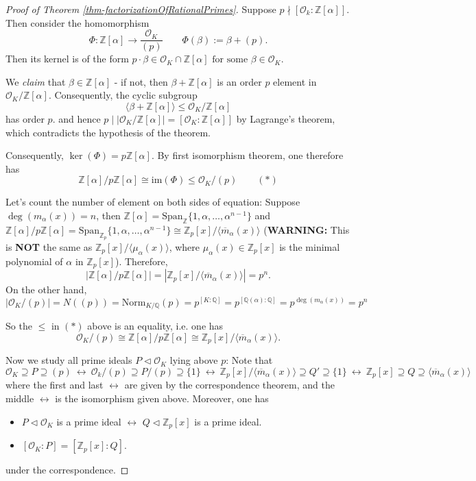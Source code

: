 \documentclass[11pt]{book}
\begin{document}
\begin{proof}[Proof of Theorem \ref{thm-factorizationOfRationalPrimes}]
Suppose $ p \nmid [\mathcal{O}_k : \mathbb{Z}[\alpha]]$. Then consider the homomorphism
$$
\Phi: \mathbb{Z}[\alpha] \longrightarrow \frac{\mathcal{O}_K}{(p)} \quad \quad \Phi(\beta):= \beta + (p).
$$
Then its kernel is of the form
$
p \cdot \beta \in \mathcal{O}_K \cap \mathbb{Z}[\alpha] \text{ for some } \beta \in \mathcal{O}_K.
$

We \textit{claim} that $\beta \in \mathbb{Z}[\alpha]$ - if not, then
$\beta + \mathbb{Z}[\alpha]$ is an order $p$ element in $\mathcal{O}_K/\mathbb{Z}[\alpha]$. Consequently, the cyclic subgroup
$$\langle \beta + \mathbb{Z}[\alpha] \rangle \leq \mathcal{O}_K/\mathbb{Z}[\alpha]$$ 
has order $p$. and hence $ p \mid \left|\mathcal{O}_K/\mathbb{Z}[\alpha]\right| = [\mathcal{O}_K : \mathbb{Z}[\alpha]]$ by Lagrange's theorem, which contradicts the hypothesis of the theorem.

\medskip
Consequently, $\ker(\Phi) = p\mathbb{Z}[\alpha]$. By first isomorphism theorem, one therefore has
$$\mathbb{Z}[\alpha]/ p \mathbb{Z}[\alpha] \cong \mathrm{im}(\Phi) \leq \mathcal{O}_K/(p)  \quad \quad   (*)$$

Let's count the number of element on both sides of equation: Suppose $\deg(m_{\alpha}(x)) = n$, then $\mathbb{Z}[\alpha] = \text{Span}_{\mathbb{Z}} \{1, \alpha, \ldots, \alpha^{n-1}\}$
and $\mathbb{Z}[\alpha]/p\mathbb{Z}[\alpha] = \text{Span}_{\mathbb{Z}_p} \{1, \alpha, \ldots, \alpha^{n-1}\} \cong  \mathbb{Z}_p[x]/\langle \overline{m}_{\alpha}(x)\rangle$ ({\bf WARNING:} This is {\bf NOT} the same as $\mathbb{Z}_p[x]/\langle\mu_{\alpha}(x)\rangle$, where $\mu_{\alpha}(x) \in \mathbb{Z}_p[x]$ is the minimal polynomial of $\alpha$ in $\mathbb{Z}_p[x]$). Therefore, 
$$|\mathbb{Z}[\alpha]/p\mathbb{Z}[\alpha]| = | \mathbb{Z}_p[x]/\langle \overline{m}_{\alpha}(x)\rangle| = p^n.$$
On the other hand, 
$$|\mathcal{O}_K/(p)| = N((p)) = \mathrm{Norm}_{K/\mathbb{Q}}(p) = p^{[K:\mathbb{Q}]} = p^{[\mathbb{Q}(\alpha):\mathbb{Q}]} = p^{\deg(m_{\alpha}(x))} = p^n$$

So the $\leq$ in $(*)$ above is an equality, i.e. one has $$\mathcal{O}_K/(p) \cong \mathbb{Z}[\alpha]/p\mathbb{Z}[\alpha] \cong  \mathbb{Z}_p[x]/\langle \overline{m}_{\alpha}(x)\rangle.$$

Now we study all prime ideals $P \lhd \mathcal{O}_K$ lying above $p$: Note that
$$\mathcal{O}_K \supseteq P \supseteq (p) 
\ \leftrightarrow \ \mathcal{O}_k/(p) \supseteq P/(p) \supseteq \{1\} \ \leftrightarrow \ \mathbb{Z}_p[x]/\langle \overline{m}_{\alpha}(x)\rangle \supseteq Q' \supseteq \{1\} \ \leftrightarrow \  \mathbb{Z}_p[x] \supseteq Q \supseteq \langle \overline{m}_{\alpha}(x)\rangle$$
where the first and last $\leftrightarrow$ are given by the correspondence theorem, and the middle $\leftrightarrow$ is the isomorphism given above. Moreover, one has
\begin{itemize}
    \item $P \lhd \mathcal{O}_K$ is a prime ideal $\leftrightarrow$ $Q \lhd \mathbb{Z}_p[x]$ is a prime ideal. 
    \item $[\mathcal{O}_K:P] = [\mathbb{Z}_p[x]: Q]$.
\end{itemize}
under the correspondence.


\end{proof}
\end{document}
